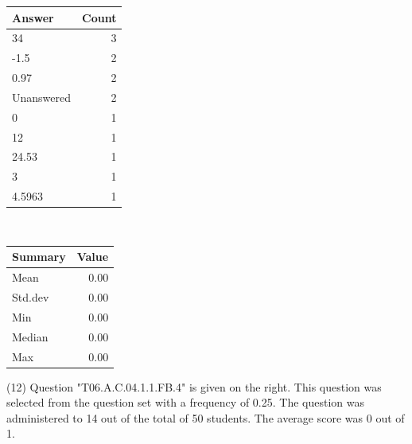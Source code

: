 \documentclass[12pt,english,nohyper]{tufte-handout}\usepackage[]{graphicx}\usepackage[]{color}
\begin{document}
\begin{center}%
\begin{tabular}{lr}
  \hline
Answer & Count \\ 
  \hline
34 &   3 \\ 
  -1.5 &   2 \\ 
  0.97 &   2 \\ 
  Unanswered &   2 \\ 
  0 &   1 \\ 
  12 &   1 \\ 
  24.53 &   1 \\ 
  3 &   1 \\ 
  4.5963 &   1 \\ 
   \hline
\end{tabular}
~~~~~~~~%
\begin{tabular}{lr}
  \hline
Summary & Value \\ 
  \hline
Mean & 0.00 \\ 
  Std.dev & 0.00 \\ 
  Min & 0.00 \\ 
  Median & 0.00 \\ 
  Max & 0.00 \\ 
   \hline
\end{tabular}
\end{center}\newpage{} (12) Question "T06.A.C.04.1.1.FB.4" is given on the right. This question was selected from the question set with a frequency of 0.25. The question was administered to 14 out of the total of 50 students. The average score was 0 out of 1.
\end{document}
